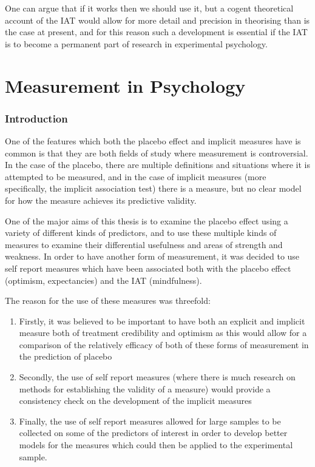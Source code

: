 One can argue that if it works then we should use it, but a cogent theoretical account of the IAT would allow for more detail and precision in theorising  than is the case at present, and for this reason such a development is essential if the IAT is to become a permanent part of research in experimental psychology.

\part{Measurement in Psychology}
\label{part:meas-psych}

\section{Introduction}
\label{sec:introduction}



One of the features which both the placebo effect and implicit measures have is common is that they are both fields of study where measurement is controversial. In the case of the placebo, there are multiple definitions and situations where it is attempted to be measured, and in the case of implicit measures (more specifically, the implicit association test) there is a measure, but no clear model for how the measure achieves its predictive validity. 

One of the major aims of this thesis is to examine the placebo effect using a variety of different kinds of predictors, and to use these multiple kinds of measures to examine their differential usefulness and areas of strength and weakness. In order to have another form of measurement, it was decided to use self report measures which have been associated both with the placebo effect (optimism, expectancies) and the IAT (mindfulness). 

The reason for the use of these measures was threefold:
\begin{enumerate}
\item Firstly, it was believed to be important to have both an explicit and implicit measure both of treatment credibility and optimism as this would allow for a comparison of the relatively efficacy of both of these forms of measurement in the prediction of placebo
\item Secondly, the use of self report measures (where there is much research on methods for establishing the validity of a measure) would provide a consistency check on the development of the implicit measures
\item Finally, the use of self report measures allowed for large samples to be collected on some of the predictors of interest in order to develop better models for the measures which could then be applied to the experimental sample. 
\end{enumerate}

